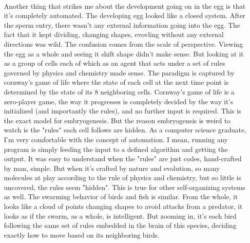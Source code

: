 \documentclass{article}
\begin{document}
\paragraph{}
Another thing that strikes me about the development going on in the egg is that it's completely automated. The developing egg looked like a closed system. After the sperm entry, there wasn't any external information going into the egg. The fact that it kept dividing, changing shapes, evovling without any external directions was wild. The confusion comes from the scale of perspective. Viewing the egg as a whole and seeing it shift shape didn't make sense. But looking at it as a group of cells each of which as an agent that acts under a set of rules governed by physics and chemistry made sense. The paradigm is captured by cornway's game of life where the state of each cell at the next time point is determined by the state of its 8 neighboring cells. Cornway's game of life is a zero-player game, the way it progresses is completely decided by the way it's initialized (and importantly the rules), and no further input is required. This is the exact model for embryogenesis. But the reason embryogensis is weird to watch is the "rules" each cell follows are hidden. As a computer science graduate, I'm very comfortable with the concept of automation. I mean, running any program is simply feeding the input to a defined algorithm and getting the output. It was easy to understand when the "rules" are just codes, hand-crafted by man, simple. But when it's crafted by nature and evolution, so many molecules at play according to the rule of physics and chemistry, but so little is uncovered, the rules seem "hidden". This is true for other self-organizing systems as well. The swarming behavior of birds and fish is similar. From the whole, it looks like a cloud of points changing shapes to avoid attacks from a predator, it looks as if the swarm, as a whole, is intelligent. But zooming in, it's each bird following the same set of rules embedded in the brain of this species, deciding exactly how to move based on its neighboring birds. 
\end{document}
